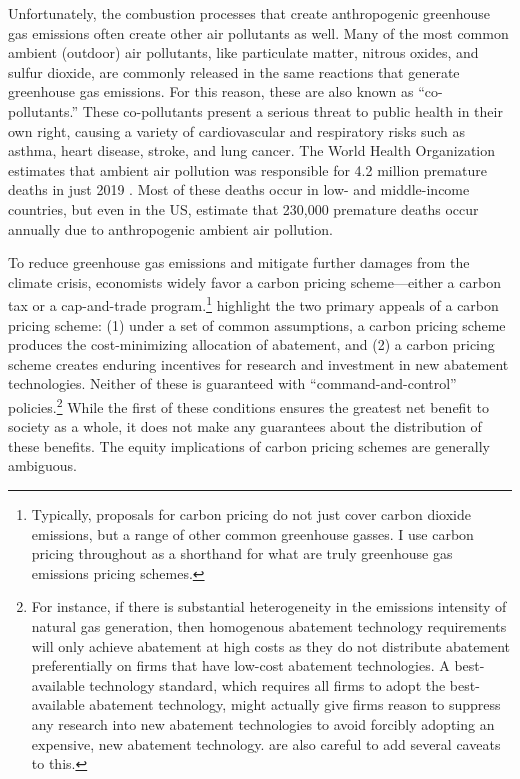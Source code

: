 \documentclass[11pt]{article}
\begin{document}
Unfortunately, the combustion processes that create anthropogenic greenhouse gas emissions often create other air pollutants as well. Many of the most common ambient (outdoor) air pollutants, like particulate matter, nitrous oxides, and sulfur dioxide, are commonly released in the same reactions that generate greenhouse gas emissions. For this reason, these are also known as ``co-pollutants.'' These co-pollutants present a serious threat to public health in their own right, causing a variety of cardiovascular and respiratory risks such as asthma, heart disease, stroke, and lung cancer. The World Health Organization estimates that ambient air pollution was responsible for 4.2 million premature deaths in just 2019 \citep{who_factsheet}. Most of these deaths occur in low- and middle-income countries, but even in the US, \cite{lelieveld2019effects} estimate that 230,000 premature deaths occur annually due to anthropogenic ambient air pollution.

To reduce greenhouse gas emissions and mitigate further damages from the climate crisis, economists widely favor a carbon pricing scheme---either a carbon tax or a cap-and-trade program.\footnote{Typically, proposals for carbon pricing do not just cover carbon dioxide emissions, but a range of other common greenhouse gasses. I use carbon pricing throughout as a shorthand for what are truly greenhouse gas emissions pricing schemes.} \cite{keohane2016markets} highlight the two primary appeals of a carbon pricing scheme: (1) under a set of common assumptions, a carbon pricing scheme produces the cost-minimizing allocation of abatement, and (2) a carbon pricing scheme creates enduring incentives for research and investment in new abatement technologies. Neither of these is guaranteed with ``command-and-control'' policies.\footnote{
	For instance, if there is substantial heterogeneity in the emissions intensity of natural gas generation, then homogenous abatement technology requirements will only achieve abatement at high costs as they do not distribute abatement preferentially on firms that have low-cost abatement technologies. A best-available technology standard, which requires all firms to adopt the best-available abatement technology, might actually give firms reason to suppress any research into new abatement technologies to avoid forcibly adopting an expensive, new abatement technology. \cite{keohane2016markets} are also careful to add several caveats to this.
} While the first of these conditions ensures the greatest net benefit to society as a whole, it does not make any guarantees about the distribution of these benefits. The equity implications of carbon pricing schemes are generally ambiguous.  
\end{document}
